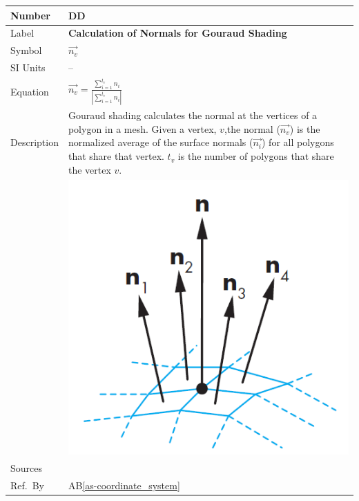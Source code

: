 \documentclass[12pt]{article}
\newcommand{\colAwidth}{0.13\textwidth}
\newcommand{\colBwidth}{0.82\textwidth}
\newcounter{defnum} %
\newcounter{datadefnum} %
\newcommand{\aBref}[1]{AB\ref{#1}}
\begin{document}
\noindent
\begin{minipage}{\textwidth}
	\renewcommand*{\arraystretch}{1.5}
	\begin{tabular}{| p{\colAwidth} | p{\colBwidth}|}
		\hline
		\rowcolor[gray]{0.9}
		Number& DD{datadefnum}\thedatadefnum 
		\label{DD_Gouraud_Shading}\\
		\hline
		Label& \bf Calculation of Normals for Gouraud Shading\\
		\hline
		Symbol &$\vec{n_{v}}$\\
		\hline
		SI Units & --\\
		\hline
		Equation&$\vec{n_{v}} = 
		\frac{\sum_{i=1}^{t_{v}}n_{i}}{|\sum_{i=1}^{t_{v}}n_{i}|}$\\
		\hline
		Description & Gouraud shading calculates the normal at the vertices of 
		a polygon in a mesh. Given a vertex, $v$,the normal ($\vec{n_{v}}$) is 
		the normalized average of the surface normals ($\vec{n_{i}}$) for all 
		polygons that share that vertex. $t_{v}$ is the number of polygons that 
		share the vertex $v$.\\
		& \includegraphics[]{./images/gouraud-shading-interpolation}\\
		\hline
		Sources& \cite{shreiner2012}\\
		\hline
		Ref.\ By & \aBref{as-coordinate_system}\\
		\hline
	\end{tabular}
\end{minipage}\\
\end{document}
